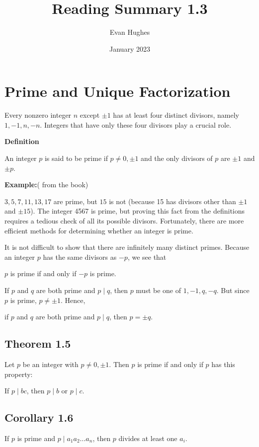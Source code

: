 \documentclass{article}
\title{Reading Summary 1.3}
\author{Evan Hughes}
\date{January 2023}
\begin{document}
\maketitle
\section*{Prime and Unique Factorization}
Every nonzero integer $n$ except $\pm 1$ has at least four distinct
divisors, namely $1, -1, n, -n$. Integers that have only these four divisors play a crucial role.

\textbf{Definition}
\begin{center}
    An integer $p$ is said to be prime if $p \neq 0, \pm 1$ and
    the only divisors of $p$ are $\pm1$ and $\pm p$.
\end{center}

\textbf{Example:}( from the book) 

$3, 5, 7, 11, 13, 17$ are prime, but $15$ is not (because 15 has divisors other than $\pm 1$ and $\pm 15$).
The integer 4567 is prime, but proving this fact from the definitions requires a tedious check of all its possible divisors.
Fortunately, there are more efficient methods for determining
whether an integer is prime.
\vspace{5mm}

It is not difficult to show that there are infinitely many distinct primes.
Because an integer $p$ has the same divisors as $-p$, we see that
\begin{center}
    $p$ is prime if and only if $-p$ is prime.
\end{center}
If $p$ and $q$ are both prime and $p\mid q$, then $p$ must be one of $1, -1, q, -q$.
But since $p$ is prime, $p \neq \pm 1$. Hence,
\begin{center}
    if $p$ and $q$ are both prime and $p \mid q$, then $p = \pm q$.
\end{center}

\subsection*{Theorem 1.5}
Let $p$ be an integer with $p \neq 0, \pm 1$. Then $p$ is prime if and only if $p$ has this property:
\begin{center}
    If $p \mid bc$, then $p \mid b$ or $p \mid c$.
\end{center}

\subsection*{Corollary 1.6}
If $p$ is prime and $p \mid a_1 a_2 \ldots a_n$, then $p$ divides at least one $a_i$.
\end{document}
